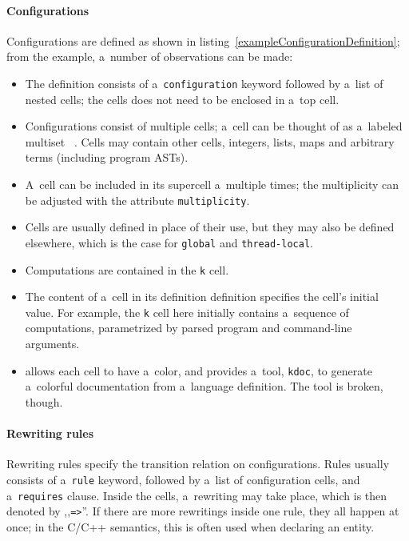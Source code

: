 \documentclass{fithesis3}
\newcommand{\kdoc}{\texttt{kdoc}\xspace}
\begin{document}
\paragraph{Configurations}
Configurations are defined as shown in listing~\ref{exampleConfigurationDefinition}; from the example, a~number of observations can be made:
\begin{itemize}
\item The definition consists of a~\texttt{configuration} keyword followed by a~list of nested cells; the cells does not need to be enclosed in a~top cell.
\item Configurations consist of multiple cells; a~cell can be thought of as a~labeled multiset ~\cite{hathhorn-ellison-rosu-2015-pldi}. Cells may contain other cells, integers, lists, maps and arbitrary terms (including program ASTs).
\item A~cell can be included in its supercell a~multiple times; the multiplicity can be adjusted with the attribute \texttt{multiplicity}.
\item Cells are usually defined in place of their use, but they may also be defined elsewhere, which is the case for \texttt{global} and \texttt{thread-local}.
\item Computations are contained in the \texttt{k} cell.
\item The content of a~cell in its definition definition specifies the cell's initial value. For example, the \texttt{k} cell here initially contains a~sequence of computations, parametrized by parsed program and command-line arguments.
\item \K allows each cell to have a~color, and provides a~tool, \kdoc , to generate a~colorful documentation from a~language definition. The tool is broken, though.
\end{itemize}


\paragraph{Rewriting rules}
Rewriting rules specify the transition relation on configurations. Rules usually consists of a~\texttt{rule} keyword, followed by a~list of configuration cells, and a~\texttt{requires} clause. Inside the cells, a~rewriting may take place, which is then denoted by ,,\lstinline{=>}''. If there are more rewritings inside one rule, they all happen at once; in the C/C++ semantics, this is often used when declaring an entity.
\end{document}
